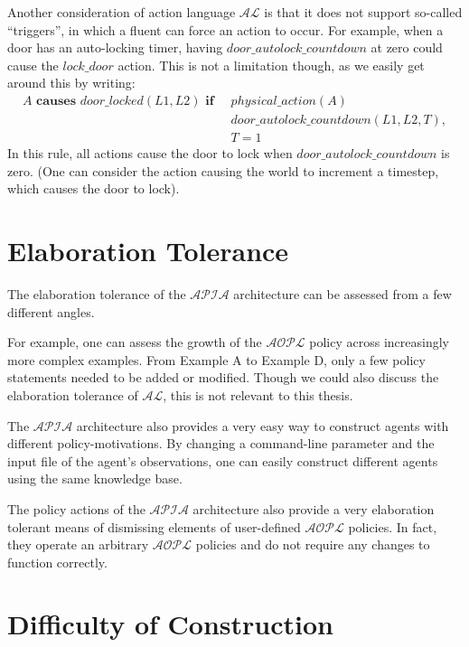 Another consideration of action language $\mathcal{AL}$ is that it does not support so-called ``triggers'', in which a fluent can force an action to occur.
For example, when a door has an auto-locking timer, having $door\_autolock\_countdown$ at zero could cause the $lock\_door$ action.
This is not a limitation though, as we easily get around this by writing:
\begin{equation}
\begin{split}
    A \textbf{ causes } door\_locked(L1, L2) \textbf{ if } \
        & physical\_action(A) \\
        & door\_autolock\_countdown(L1, L2, T), \\
        & T = 1
\end{split}
\end{equation}
In this rule, all actions cause the door to lock when $door\_autolock\_countdown$ is zero.
(One can consider the action causing the world to increment a timestep, which causes the door to lock).

\section{Elaboration Tolerance}

The elaboration tolerance of the $\mathcal{APIA}$ architecture can be assessed from a few different angles.

For example, one can assess the growth of the $\mathcal{AOPL}$ policy across increasingly more complex examples.
From Example A to Example D, only a few policy statements needed to be added or modified.
Though we could also discuss the elaboration tolerance of $\mathcal{AL}$, this is not relevant to this thesis.

The $\mathcal{APIA}$ architecture also provides a very easy way to construct agents with different policy-motivations.
By changing a command-line parameter and the input file of the agent's observations, one can easily construct different agents using the same knowledge base.

The policy actions of the $\mathcal{APIA}$ architecture also provide a very elaboration tolerant means of dismissing elements of user-defined $\mathcal{AOPL}$ policies.
In fact, they operate an arbitrary $\mathcal{AOPL}$ policies and do not require any changes to function correctly.

\section{Difficulty of Construction}


